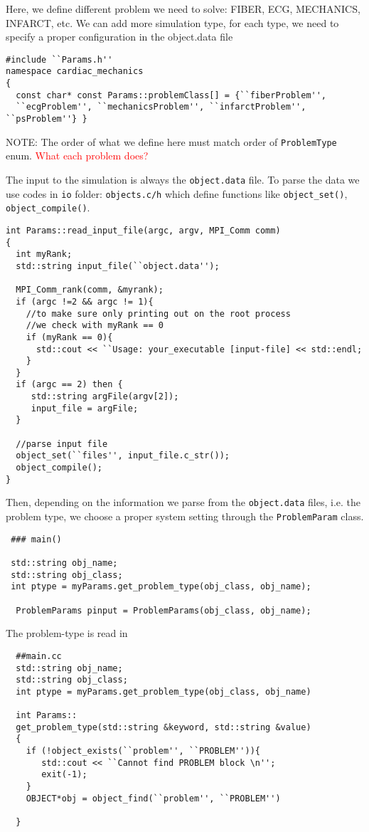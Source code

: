 Here, we define different problem we need to solve: FIBER, ECG, MECHANICS,
INFARCT, etc. We can add more simulation type, for each type, we need to
specify a proper configuration in the object.data file
{\small
\begin{verbatim}
#include ``Params.h''
namespace cardiac_mechanics
{
  const char* const Params::problemClass[] = {``fiberProblem'',
  ``ecgProblem'', ``mechanicsProblem'', ``infarctProblem'', ``psProblem''} }
\end{verbatim} 
}
NOTE: The order of what we define here must match order of \verb!ProblemType!
enum. \textcolor{red}{What each problem does?}
  

The input to the simulation is always the \verb!object.data! file. To parse the
data we use codes in \verb!io! folder: \verb!objects.c/h! which define
functions like \verb!object_set()!, \verb!object_compile()!.

{\small
\begin{verbatim}
int Params::read_input_file(argc, argv, MPI_Comm comm)
{
  int myRank;
  std::string input_file(``object.data'');
  
  MPI_Comm_rank(comm, &myrank);
  if (argc !=2 && argc != 1){
    //to make sure only printing out on the root process
    //we check with myRank == 0
    if (myRank == 0){
      std::cout << ``Usage: your_executable [input-file] << std::endl;
    }
  }
  if (argc == 2) then {
     std::string argFile(argv[2]);
     input_file = argFile;
  }
  
  //parse input file 
  object_set(``files'', input_file.c_str());
  object_compile();
}
\end{verbatim} } 
  

 Then, depending on the information we parse from the \verb!object.data! files,
 i.e. the problem type, we choose a proper system setting through the
 \verb!ProblemParam! class.
\begin{verbatim}
 ### main()
 
 std::string obj_name;
 std::string obj_class;
 int ptype = myParams.get_problem_type(obj_class, obj_name);
 
  ProblemParams pinput = ProblemParams(obj_class, obj_name);
\end{verbatim}
  

The problem-type is read in
  {\small \begin{verbatim}
  ##main.cc
  std::string obj_name;
  std::string obj_class;
  int ptype = myParams.get_problem_type(obj_class, obj_name)
  
  int Params::
  get_problem_type(std::string &keyword, std::string &value)
  {
    if (!object_exists(``problem'', ``PROBLEM'')){
       std::cout << ``Cannot find PROBLEM block \n'';
       exit(-1);
    }
    OBJECT*obj = object_find(``problem'', ``PROBLEM'')
    
  }
  \end{verbatim} }
  
